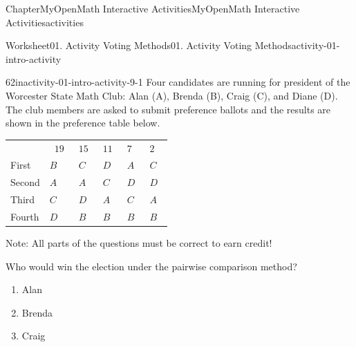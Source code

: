 \documentclass[oneside,10pt,]{book}
\newcommand{\blocktitlefont}{\relax}
\newcommand{\tabularfont}{\relax}
\newcommand{\ptxlistdisc}{\raisebox{0.3ex}{\textbullet}}
\newlength{\fillinmaxwidth}
\newlength{\fillincontract}
\newlength{\charmaxwidth}\setlength{\charmaxwidth}{0.5em}
\newlength{\charminwidth}\setlength{\charminwidth}{0.1em}
\newlength{\fillinheight}
\newcommand{\fillintext}[1]{%
\setlength{\fillinmaxwidth}{#1\charmaxwidth}%
\setlength{\fillincontract}{#1\charminwidth}%
\setlength{\fillinheight}{\baselineskip}\addtolength{\fillinheight}{1.2pt}%
\strut\nobreak\leaders\vbox{\hrule width 0.3pt height 0.3pt \vskip -1.2pt}\hskip 1\fillinmaxwidth minus \fillincontract\nobreak\strut%
}
\begin{document}
\begin{chapterptx}{Chapter}{MyOpenMath Interactive Activities}{}{MyOpenMath Interactive Activities}{}{}{activities}
\begin{worksheet-section}{Worksheet}{01. Activity Voting Methods}{}{01. Activity Voting Methods}{}{}{activity-01-intro-activity}
%
\clearpage
\begin{divisionexercise}{6}{}{2in}{activity-01-intro-activity-9-1}%
Four candidates are running for president of the Worcester State Math Club: Alan (A), Brenda (B), Craig (C), and Diane (D). The club members are asked to submit preference ballots and the results are shown in the preference table below.%
\begin{center}%
{\tabularfont%
\begin{tabular}{llllll}
 & \(\displaystyle{19}\) &\(\displaystyle{15}\) &\(\displaystyle{11}\) &\(\displaystyle{7}\) &\(\displaystyle{2}\) \tabularnewline[0pt]
First&\(\displaystyle{B}\) &\(\displaystyle{C}\) &\(\displaystyle{D}\) &\(\displaystyle{A}\) &\(\displaystyle{C}\) \tabularnewline[0pt]
Second&\(\displaystyle{A}\) &\(\displaystyle{A}\) &\(\displaystyle{C}\) &\(\displaystyle{D}\) &\(\displaystyle{D}\) \tabularnewline[0pt]
Third&\(\displaystyle{C}\) &\(\displaystyle{D}\) &\(\displaystyle{A}\) &\(\displaystyle{C}\) &\(\displaystyle{A}\) \tabularnewline[0pt]
Fourth&\(\displaystyle{D}\) &\(\displaystyle{B}\) &\(\displaystyle{B}\) &\(\displaystyle{B}\) &\(\displaystyle{B}\) 
\end{tabular}
}%
\end{center}%
Note: All parts of the questions must be correct to earn credit!%
\par
Who would win the election under the pairwise comparison method?%
\par
%
\begin{enumerate}[label={(\alph*)}]
\item{}Alan%
\item{}Brenda%
\item{}Craig%

\end{enumerate}
\end{divisionexercise}
\end{worksheet-section}
\end{chapterptx}
\end{document}
